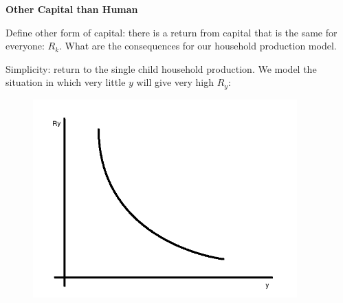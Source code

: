 \documentclass[14pt,notitlepage]{article}
\begin{document}
\textbf{Other Capital than Human}

Define other form of capital: there is a return from capital that is the same for everyone: $R_k$. What are the consequences for our household production model.

Simplicity: return to the single child household production. We model the situation in which very little $y$ will give very high $R_y$: \\

\begin{center}
\begin{figure}[H] 
\caption{}
\centering
\includegraphics[width=4in, height=3in]{plot10.png}
\end{figure}
\end{center}
\end{document}
